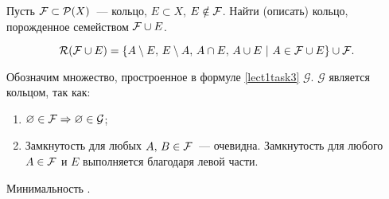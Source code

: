 \begin{task}{3}
    Пусть $\mathcal{F}  \subset \mathcal{P} (X)$~--- кольцо, $E\subset X$, $E\notin \mathcal{F} $. Найти (описать)
    кольцо, порожденное семейством $\mathcal{F} \cup E$.
\end{task}

\begin{solution}
    \begin{equation}
        \mathcal{R} (\mathcal{F} \cup E) = \left\{A\setminus E,\, E\setminus A,\, A\cap E,\, A\cup E \ |\  A \in \mathcal{F} \cup E\right\} \cup \mathcal{F} .
        \label{lect1task3}
    \end{equation}

    Обозначим множество, простроенное в формуле \eqref{lect1task3} $\mathcal{G}$.
    $\mathcal{G} $ является кольцом, так как:
    \begin{enumerate}
        \item $\varnothing\in\mathcal{F} \Rightarrow\varnothing\in \mathcal{G} $;
        \item Замкнутость для любых $A,\, B\in \mathcal{F} $~--- очевидна. Замкнутость для любого $A\in\mathcal{F} $ и $E$ выполняется благодаря
              левой части.
    \end{enumerate}

    Минимальность .

\end{solution}